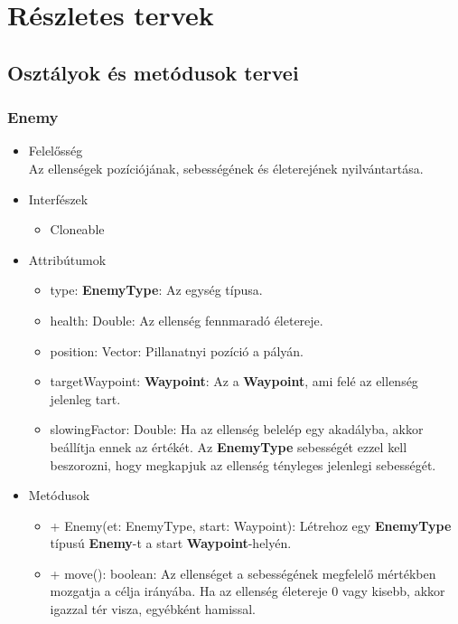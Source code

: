 %
\chapter{Részletes tervek}

\thispagestyle{fancy}

\section{Osztályok és metódusok tervei}

\subsection{Enemy}
\begin{itemize}
\item Felelősség\\
Az ellenségek pozíciójának, sebességének és életerejének nyilvántartása.
\item Interfészek\newline
\begin{itemize}
\item Cloneable
\end{itemize}
\item Attribútumok
	\begin{itemize}
		\item type: \textbf{EnemyType}: Az egység típusa.
		\item health: Double: Az ellenség fennmaradó életereje.
		\item position: Vector: Pillanatnyi pozíció a pályán.
		\item targetWaypoint: \textbf{Waypoint}: Az a \textbf{Waypoint}, ami felé az ellenség jelenleg tart.
		\item slowingFactor: Double: Ha az ellenség belelép egy akadályba, akkor beállítja ennek az értékét. Az \textbf{EnemyType} sebességét ezzel kell beszorozni, hogy megkapjuk az ellenség tényleges jelenlegi sebességét.
	\end{itemize}
\item Metódusok
	\begin{itemize}
		\item + Enemy(et: EnemyType, start: Waypoint): Létrehoz egy \textbf{EnemyType} típusú \textbf{Enemy}-t a start \textbf{Waypoint}-helyén.
		\item + move(): boolean: Az ellenséget a sebességének megfelelő mértékben mozgatja a célja irányába. Ha az ellenség életereje 0 vagy kisebb, akkor igazzal tér visza, egyébként hamissal.

\end{itemize}
\end{itemize}
